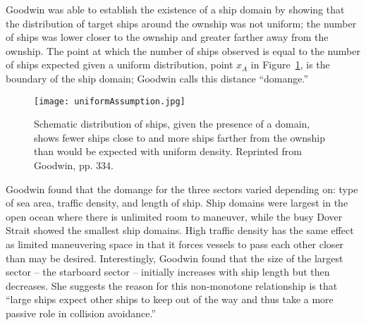 \documentclass[twoside,symmetric,notoc]{tufte-book}
\begin{document}
\par{%
Goodwin was able to establish the existence of a ship domain by showing that the distribution of target ships around the ownship was not uniform; the number of ships was lower closer to the ownship and greater farther away from the ownship. The point at which the number of ships observed is equal to the number of ships expected given a uniform distribution, point $x_{A}$ in Figure~\ref{fig:presenceOfDomain}, is the boundary of the ship domain; Goodwin calls this distance ``domange.'' 
}
\begin{figure}
\centering
	\texttt{[image: uniformAssumption.jpg]}
	\caption[Schematic distribution of ships, given the presence of a domain, shows fewer ships close to and more ships farther from the ownship than would be expected with uniform density]{Schematic distribution of ships, given the presence of a domain, shows fewer ships close to and more ships farther from the ownship than would be expected with uniform density. Reprinted from Goodwin, pp. 334.}
	\label{fig:presenceOfDomain}
	\forceversofloat
\end{figure}
\par{%
Goodwin found that the domange for the three sectors varied depending on: type of sea area, traffic density, and length of ship. Ship domains were largest in the open ocean where there is unlimited room to maneuver, while the busy Dover Strait showed the smallest ship domains. High traffic density has the same effect as limited maneuvering space in that it forces vessels to pass each other closer than may be desired. Interestingly, Goodwin found that the size of the largest sector -- the starboard sector -- initially increases with ship length but then decreases. She suggests the reason for this non-monotone relationship is that ``large ships expect other ships to keep out of the way and thus take a more passive role in collision avoidance.''
}
\end{document}
